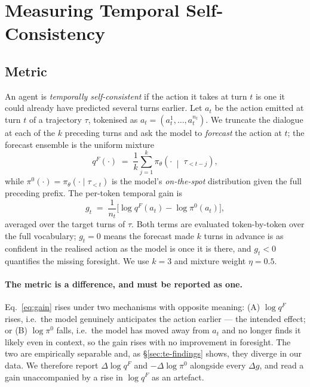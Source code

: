 
\section{Measuring Temporal Self-Consistency}
\label{sec:te}

\subsection{Metric}
\label{sec:te-metric}

An agent is \emph{temporally self-consistent} if the action it takes at turn $t$ is one
it could already have predicted several turns earlier. Let $a_t$ be the action emitted
at turn $t$ of a trajectory $\tau$, tokenised as $a_t = (a_t^1,\dots,a_t^{n_t})$. We
truncate the dialogue at each of the $k$ preceding turns and ask the model to
\emph{forecast} the action at $t$; the forecast ensemble is the uniform mixture
\begin{equation}
  q^{F}(\cdot) \;=\; \frac{1}{k}\sum_{j=1}^{k}
  \pi_\theta\!\left(\cdot \;\middle|\; \tau_{<t-j}\right),
  \label{eq:qf}
\end{equation}
while $\pi^{0}(\cdot) = \pi_\theta(\cdot \mid \tau_{<t})$ is the model's
\emph{on-the-spot} distribution given the full preceding prefix. The per-token
temporal gain is
\begin{equation}
  g_t \;=\; \frac{1}{n_t}\Big[\log q^{F}(a_t) - \log \pi^{0}(a_t)\Big],
  \label{eq:gain}
\end{equation}
averaged over the target turns of $\tau$. Both terms are evaluated token-by-token over
the full vocabulary; $g_t = 0$ means the forecast made $k$ turns in advance is as
confident in the realised action as the model is once it is there, and $g_t < 0$
quantifies the missing foresight. We use $k=3$ and mixture weight $\eta = 0.5$.

\paragraph{The metric is a difference, and must be reported as one.}
Eq.~\eqref{eq:gain} rises under two mechanisms with opposite meaning: (A)
$\log q^{F}$ rises, i.e.\ the model genuinely anticipates the action earlier --- the
intended effect; or (B) $\log \pi^{0}$ falls, i.e.\ the model has moved away from
$a_t$ and no longer finds it likely even in context, so the gain rises with no
improvement in foresight. The two are empirically separable and, as
\S\ref{sec:te-findings} shows, they diverge in our data. We therefore report
$\Delta \log q^{F}$ and $-\Delta \log \pi^{0}$ alongside every $\Delta g$, and read a
gain unaccompanied by a rise in $\log q^{F}$ as an artefact.

